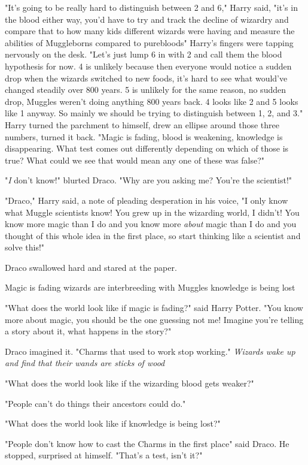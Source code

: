 "It's going to be really hard to distinguish between 2 and 6," Harry said,
"it's in the blood either way, you'd have to try and track the decline of
wizardry and compare that to how many kids different wizards were having and
measure the abilities of Muggleborns compared to purebloods{\el}" Harry's
fingers were tapping nervously on the desk. "Let's just lump 6 in with 2 and
call them the blood hypothesis for now. 4 is unlikely because then everyone
would notice a sudden drop when the wizards switched to new foods, it's hard to
see what would've changed steadily over 800 years. 5 is unlikely for the same
reason, no sudden drop, Muggles weren't doing anything 800 years back. 4 looks
like 2 and 5 looks like 1 anyway. So mainly we should be trying to distinguish
between 1, 2, and 3." Harry turned the parchment to himself, drew an ellipse
around those three numbers, turned it back. "Magic is fading, blood is
weakening, knowledge is disappearing. What test comes out differently depending
on which of those is true? What could we see that would mean any one of these
was false?"

"\emph{I} don't know!" blurted Draco. "Why are you asking me? You're the
scientist!"

"Draco," Harry said, a note of pleading desperation in his voice, "I only know
what Muggle scientists know! You grew up in the wizarding world, I didn't! You
know more magic than I do and you know more \emph{about} magic than I do and
you thought of this whole idea in the first place, so start thinking like a
scientist and solve this!"

Draco swallowed hard and stared at the paper.

Magic is fading{\el} wizards are interbreeding with Muggles{\el}
knowledge is being lost{\el}

"What does the world look like if magic is fading?" said Harry Potter. "You
know more about magic, you should be the one guessing not me! Imagine you're
telling a story about it, what happens in the story?"

Draco imagined it. "Charms that used to work stop working." \emph{Wizards wake
up and find that their wands are sticks of wood{\el}}

"What does the world look like if the wizarding blood gets weaker?"

"People can't do things their ancestors could do."

"What does the world look like if knowledge is being lost?"

"People don't know how to cast the Charms in the first place{\el}" said
Draco. He stopped, surprised at himself. "That's a test, isn't it?"

